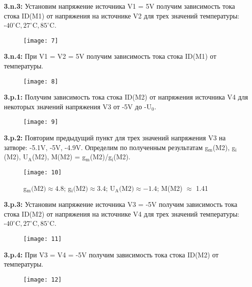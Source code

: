 \documentclass{semi}
\newcommand{\Cd}{^{\circ}\mathrm{C}}
\begin{document}
\newpage

\textbf{{\normalsize 3.n.3:}}
Установим напряжение источника V1 = 5V получим зависимость тока стока ID(M1) от напряжения на источнике V2 для трех значений температуры: $ \text{-}40\Cd, 27\Cd, 85\Cd $.
\begin{figure}[H]
	\centering
	\texttt{[image: 7]}
\end{figure}

\textbf{{\normalsize 3.n.4:}}
При V1 = V2 = 5V получим зависимость тока стока ID(M1) от температуры.
\begin{figure}[H]
\centering
\texttt{[image: 8]}
\end{figure}

\newpage





\textbf{{\normalsize 3.p.1:}}
Получим зависимость тока стока ID(M2) от напряжения источника V4 для некоторых значений напряжения V3 от -5V до -U$_0$.
\begin{figure}[H]
	\centering
	\texttt{[image: 9]}
\end{figure}

\textbf{{\normalsize 3.p.2:}}
Повторим предыдущий пункт для трех значений напряжения V3 на затворе: -5.1V, -5V, -4.9V. Определим по полученным результатам g$_{\text{m}}$(M2), g$_{\text{i}}$(M2), U$_{\text{A}}$(M2), M(M2) = g$_{\text{m}}$(M2)/g$_{\text{i}}$(M2).
\begin{figure}[H]
	\centering
	\texttt{[image: 10]}
	\caption{g$_{\text{m}}\text{(M2)} \approx 4.8$; g$_{\text{i}}\text{(M2)} \approx 3.4$; U$_{\text{A}}\text{(M2)} \approx -1.4$; M(M2) $\approx$ 1.41}
\end{figure}

\newpage

\textbf{{\normalsize 3.p.3:}}
Установим напряжение источника V3 = -5V получим зависимость тока стока ID(M2) от напряжения на источнике V4 для трех значений температуры: $ \text{-}40\Cd, 27\Cd, 85\Cd $.
\begin{figure}[H]
	\centering
	\texttt{[image: 11]}
\end{figure}

\textbf{{\normalsize 3.p.4:}}
При V3 = V4 = -5V получим зависимость тока стока ID(M2) от температуры.
\begin{figure}[H]
	\centering
	\texttt{[image: 12]}
\end{figure}
\end{document}
